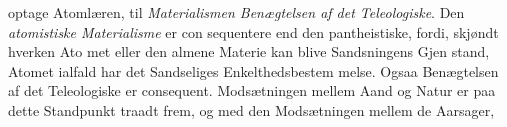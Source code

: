 optage Atomlæren, til \emph{Materialismen Benægtelsen af det
Teleologiske}. Den \emph{atomistiske Materialisme} er con\-%
sequentere end den pantheistiske, fordi, skjøndt hverken Ato\-%
met eller den almene Materie kan blive Sandsningens Gjen\-%
stand, Atomet ialfald har det Sandseliges Enkelthedsbestem\-%
melse. Ogsaa Benægtelsen af det Teleologiske er consequent.
Modsætningen mellem Aand og Natur er paa dette Standpunkt
traadt frem, og med den Modsætningen mellem de Aarsager,
